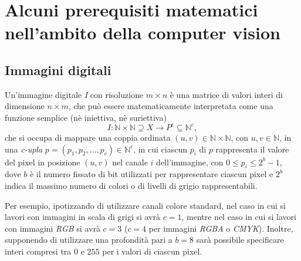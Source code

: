 \chapter{Alcuni prerequisiti matematici nell'ambito della computer vision}
\label{chap:math-prerequisites}


\section{Immagini digitali}
\label{sec:math-images}
Un'immagine digitale \textit{I} con risoluzione $m\times n$ \`e una matrice di valori interi di dimensione $n\times m$, che pu\`o essere matematicamente interpretata come una funzione semplice (n\`e iniettiva, n\`e suriettiva) 
\begin{equation}
	I: \mathbb{N}\times\mathbb{N}\supseteq X \to P^{c}\subseteq \mathbb{N}^{c},
	\label{eq:digital-image-function}
\end{equation}
che si occupa di mappare una coppia ordinata $(u,v)\in\mathbb{N}\times\mathbb{N}$, con $u,v\in\mathbb{N}$, in una \textit{c-upla} $p=(p_{1}, p_{2}, \dots, p_{c})\in\mathbb{N}^{c}$, in cui ciascun $p_{i}$ di $p$ rappresenta il valore del pixel in posizione $(u,v)$ nel canale ${i}$ dell'immagine, con $0 \leq p_{i} \leq 2^{b} - 1$, dove $b$ \`e il numero fissato di bit utilizzati per rappresentare ciascun pixel e $2^{b}$ indica il massimo numero di colori o di livelli di grigio rappresentabili.\par
Per esempio, ipotizzando di utilizzare canali colore standard, nel caso in cui si lavori con immagini in scala di grigi si avr\`a $c=1$, mentre nel caso in cui si lavori con immagini \textit{RGB} si avr\`a $c=3$ ($c=4$ per immagini \textit{RGBA} o \textit{CMYK}). Inoltre, supponendo di utilizzare una profondit\`a pari a $b=8$ sar\`a possibile specificare interi compresi tra $0$ e $255$ per i valori di ciascun pixel.



